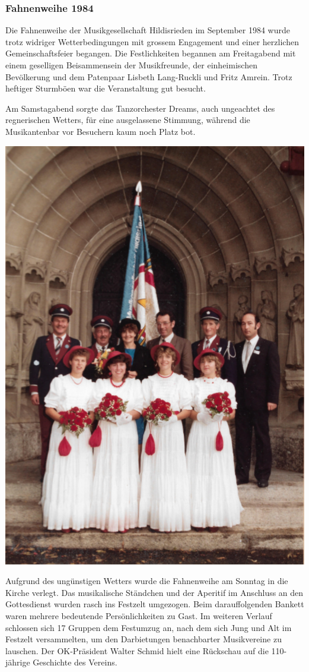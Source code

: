 \clearpage
\begin{history}

    \subsubsection*{Fahnenweihe 1984}

    Die Fahnenweihe der Musikgesellschaft Hildisrieden im September 1984 wurde
    trotz widriger Wetterbedingungen mit grossem Engagement und einer herzlichen
    Gemeinschaftsfeier begangen. Die Festlichkeiten begannen am Freitagabend mit
    einem geselligen Beisammensein der Musikfreunde, der einheimischen
    Bevölkerung und dem Patenpaar Lisbeth Lang-Ruckli und Fritz Amrein. Trotz
    heftiger Sturmböen war die Veranstaltung gut besucht.

    Am Samstagabend sorgte das Tanzorchester Dreams, auch ungeachtet des
    regnerischen Wetters, für eine ausgelassene Stimmung, während die
    Musikantenbar vor Besuchern kaum noch Platz bot.

    \begin{MulticolFigure}
        \centering
        \includegraphics[width=0.6\linewidth]{./chap/1975-2000/1984/Fahnenweihe-1984.pdf}
    \end{MulticolFigure}

    Aufgrund des ungünstigen Wetters wurde die Fahnenweihe am Sonntag in die
    Kirche verlegt. Das musikalische Ständchen und der Aperitif im Anschluss an
    den Gottesdienst wurden rasch ins Festzelt umgezogen. Beim darauffolgenden
    Bankett waren mehrere bedeutende Persönlichkeiten zu Gast. Im weiteren
    Verlauf schlossen sich 17 Gruppen dem Festumzug an, nach dem sich Jung und
    Alt im Festzelt versammelten, um den Darbietungen benachbarter Musikvereine
    zu lauschen. Der OK-Präsident Walter Schmid hielt eine Rückschau auf die
    110-jährige Geschichte des Vereins.


\end{history}
